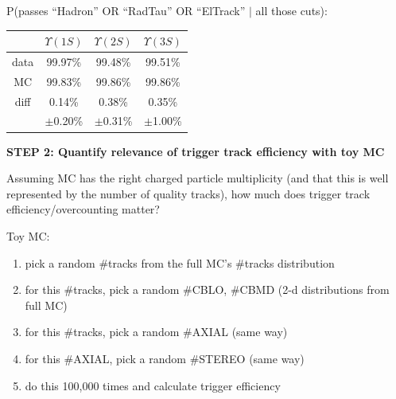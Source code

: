 \documentclass[landscape]{article}
\begin{document}
\vfill

P(passes ``Hadron'' OR ``RadTau'' OR ``ElTrack'' $|$ all those cuts):

\begin{center}
  \renewcommand{\arraystretch}{1.25}
  \begin{tabular}{c c c c}
  \mbox{\hspace{4 cm}} & \mbox{\hspace{2 cm}} $\Upsilon(1S)$ \mbox{\hspace{2 cm}} & \mbox{\hspace{2 cm}} $\Upsilon(2S)$ \mbox{\hspace{2 cm}} & \mbox{\hspace{2 cm}} $\Upsilon(3S)$ \mbox{\hspace{2 cm}} \\\hline
  data & 99.97\% & 99.48\% & 99.51\% \\
  MC & 99.83\% & 99.86\% & 99.86\% \\
  diff & 0.14\% & 0.38\% & 0.35\% \\
  & $\pm$0.20\% & $\pm$0.31\% & $\pm$1.00\%
  \end{tabular}
\end{center}

\pagebreak

\vspace{1 cm}

{\bf STEP 2: Quantify relevance of trigger track efficiency with toy MC}

\vfill

Assuming MC has the right charged particle multiplicity (and that this
is well represented by the number of quality tracks), how much does
trigger track efficiency/overcounting matter?

\vfill

Toy MC:
\begin{enumerate}

  \item pick a random \#tracks from the full MC's \#tracks distribution

  \item for this \#tracks, pick a random \#CBLO, \#CBMD (2-d distributions from full MC)

  \item for this \#tracks, pick a random \#AXIAL (same way)

  \item for this \#AXIAL, pick a random \#STEREO (same way)

  \item do this 100,000 times and calculate trigger efficiency

\end{enumerate}
\end{document}
